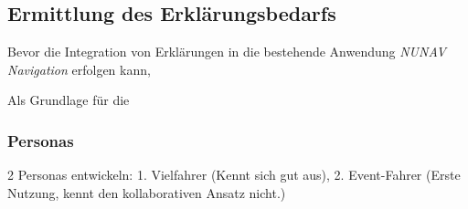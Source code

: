 \subsection{Ermittlung des Erklärungsbedarfs}



Bevor die Integration von Erklärungen in die bestehende Anwendung \textit{NUNAV Navigation} erfolgen kann, 

Als Grundlage für die 

\subsubsection{Personas}
\label{sec:06_model_evaluation:personas}

2 Personas entwickeln: 1. Vielfahrer (Kennt sich gut aus), 2. Event-Fahrer (Erste Nutzung, kennt den kollaborativen Ansatz nicht.)

